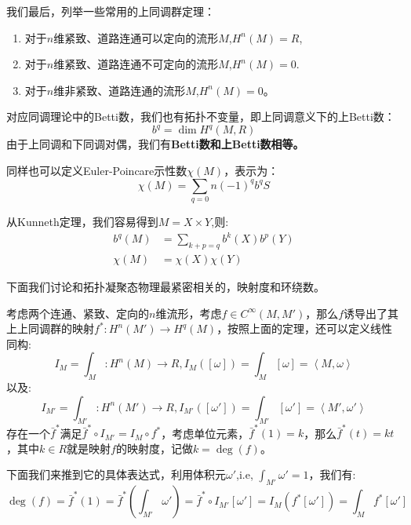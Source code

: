 \documentclass[supercite]{HustGraduPaper}
\newcommand{\avg}[1]{\left\langle #1 \right\rangle}
\begin{document}
\begin{appendices}
		我们最后，列举一些常用的上同调群定理：
		\begin{enumerate}
			\item  对于$n$维紧致、道路连通可以定向的流形$M$,$H^n(M) = R$,
			\item 对于$n$维紧致、道路连通不可定向的流形$M$,$H^n(M) = 0$.
			\item 对于$n$维非紧致、道路连通的流形$M$,$H^n(M)  =0$。
		\end{enumerate}
		对应同调理论中的Betti数，我们也有拓扑不变量，即上同调意义下的上Betti数：
		\begin{equation}
		b^q = \dim H^q(M,R)
		\end{equation}
		由于上同调和下同调对偶，我们有\textbf{Betti数和上Betti数相等。}
		
		同样也可以定义Euler-Poincare示性数$\chi(M)$，表示为：
		\begin{equation}
		\chi(M) = \sum_{q = 0}{n}(-1)^q b^qS
		\end{equation}
		
		从Kunneth定理，我们容易得到$M = X\times Y$,则:
		\begin{equation}
		\begin{split}
		b^q(M) &= \sum_{k+p = q} b^k(X) b^p(Y)\\
		\chi(M) &= \chi(X)\chi(Y)
		\end{split}
		\end{equation}
		
		下面我们讨论和拓扑凝聚态物理最紧密相关的，映射度和环绕数。
		
		考虑两个连通、紧致、定向的$n$维流形，考虑$f\in C^{\infty}(M,M')$，那么$f$诱导出了其上上同调群的映射$f^*: H^n(M') \to H^q(M)$，按照上面的定理，还可以定义线性同构:
		\begin{equation}
		I_M = \int_M: H^n(M) \to R, I_M([\omega] ) = \int_M[\omega] = \avg{M,\omega}
		\end{equation}
		以及:
		\begin{equation}
		I_{M'}= \int_{M'}: H^n(M') \to R, I_{M'}([\omega'] ) = \int_{M'}[\omega'] = \avg{M',\omega'}
		\end{equation}
		存在一个$\bar{f}^*$满足$\bar{f}^* \circ I_{M'} = I_M \circ f^*$，考虑单位元素，$\bar{f}^*(1) = k$，那么$\bar{f}^*(t) = kt$，其中$k \in R$就是映射$f$的映射度，记做$k = \deg(f)$。
		
		下面我们来推到它的具体表达式，利用体积元$\omega'$,i.e, $\int_{M'} \omega' = 1$，我们有:
		\begin{equation}
		\deg(f) = \bar{f}^*(1) =\bar{f}^*(\int_{M'} \omega') = \bar{f}^*\circ I_{M'}[\omega'] = I_M(f^*[\omega']) = \int_M f^*[\omega'] 
		\end{equation}
		

\end{appendices}
\end{document}
